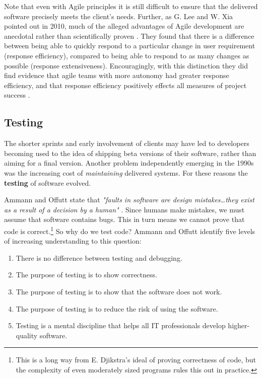 \documentclass[10pt]{article}
\begin{document}
Note that even with Agile principles it is still difficult to ensure that the delivered software precisely meets the client's needs. Further, as G. Lee and W. Xia pointed out in 2010, much of the alleged advantages of Agile development are anecdotal rather than scientifically proven \cite{LX10}. They found that there is a difference between being able to quickly respond to a particular change in user requirement (response efficiency), compared to being able to respond to as many changes as possible (response extensiveness). Encouragingly, with this distinction they did find evidence that agile teams with more autonomy had greater response efficiency, and that response efficiency positively effects all measures of project success \cite[pp. 97-98]{LX10}.


\subsection{Testing} \label{testing}
The shorter sprints and early involvement of clients may have led to developers becoming used to the idea of shipping beta versions of their software, rather than aiming for a final version. Another problem independently emerging in the 1990s was the increasing cost of \emph{maintaining} delivered systems. For these reasons the \textbf{testing} of software evolved.

Ammann and Offutt state that \emph{"faults in software are design mistakes\ldots they exist as a result of a decision by a human"} \cite[p. 29]{Amman16}. Since humans make mistakes, we must assume that software contains bugs. This in turn means we cannot prove that code is correct.\footnote{This is a long way from E. Djikstra's ideal of proving correctness of code, but the complexity of even moderately sized programs rules this out in practice.} So why do we test code? Ammann and Offutt identify five levels of increasing understanding to this question:
\begin{enumerate}
\item There is no difference between testing and debugging.
\item The purpose of testing is to show correctness.
\item The purpose of testing is to show that the software does not work.
\item The purpose of testing is to reduce the risk of using the software.
\item Testing is a mental discipline that helps all IT professionals develop higher-quality software.
\end{enumerate}
\end{document}
